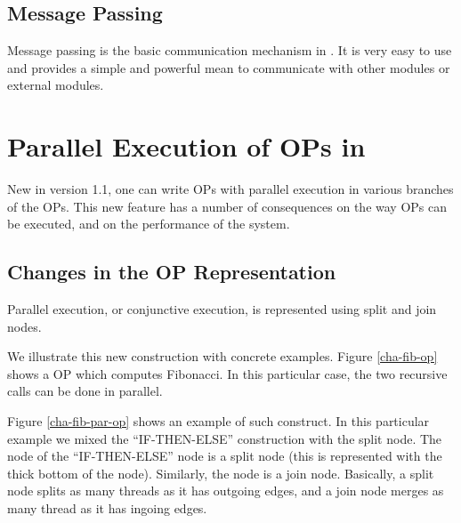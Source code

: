 \section{Message Passing}

Message passing is the basic communication mechanism in \COPRS{}. It is
very easy to use and provides a simple and powerful mean to communicate
with other \COPRS{} modules or external modules.

\chapter{Parallel Execution of OPs in \COPRS{}}

New in version 1.1, one can write OPs with parallel execution in various
branches of the OPs. This new feature has a number of consequences on the way
OPs can be executed, and on the performance of the system.



\section{Changes in the OP Representation}

Parallel execution, or conjunctive execution, is represented using split and
join nodes.


We illustrate this new construction with concrete examples.  Figure
\ref{cha-fib-op} shows a OP which computes Fibonacci. In this particular case,
the two recursive calls can be done in parallel.


Figure \ref{cha-fib-par-op} shows an example of such construct. In this
particular example we mixed the ``IF-THEN-ELSE'' construction with the split
node. The  node of the  ``IF-THEN-ELSE'' node is a split node
(this is represented with the thick bottom of the node). Similarly, the
 node is a join node.  Basically, a split node splits as many threads
as it has outgoing edges, and a join node merges as many thread as it has
ingoing edges.

